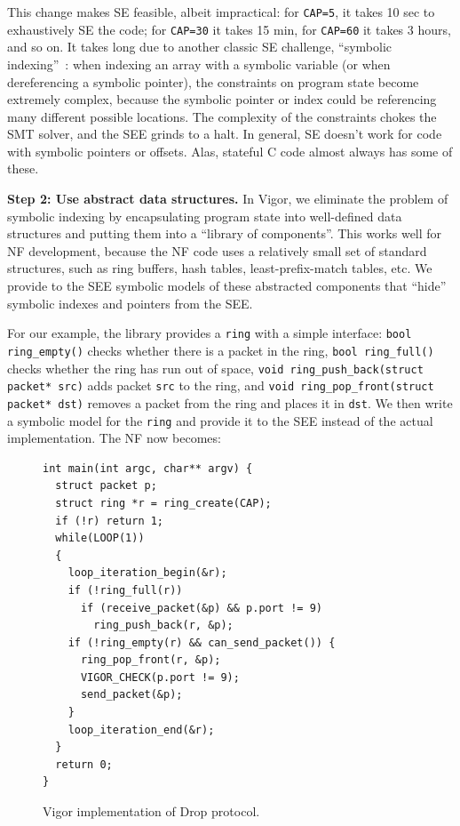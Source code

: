 \documentclass[letterpaper,twocolumn,10pt]{article}
\newcommand{\code}[1]{\lstinline{#1}}
\begin{document}
This change makes SE feasible, albeit impractical: for \code{CAP=5}, it takes 10 sec to exhaustively SE the code; for \code{CAP=30} it takes 15 min, for \code{CAP=60} it takes 3 hours, and so on. It takes long due to another classic SE challenge, ``symbolic indexing''~\cite{sen2005cute,godefroid2008automated,boonstoppel2008rwset}: when indexing an array with a symbolic variable (or when dereferencing a symbolic pointer), the constraints on program state become extremely complex, because the symbolic pointer or index could be referencing many different possible locations. The complexity of the constraints chokes the SMT solver, and the SEE grinds to a halt. In general, SE doesn't work for code with symbolic pointers or offsets. Alas, stateful C code almost always has some of these.

{\bf Step 2: Use abstract data structures.} In Vigor, we eliminate the problem of symbolic indexing by encapsulating program state into well-defined data structures and putting them into a ``library of components''. This works well for NF development, because the NF code uses a relatively small set of standard structures, such as ring buffers, hash tables, least-prefix-match tables, etc. We provide to the SEE symbolic models of these abstracted components that ``hide'' symbolic indexes and pointers from the SEE.

For our example, the library provides a \code{ring} with a simple interface: \code{bool ring_empty()} checks whether there is a packet in the ring, \code{bool ring_full()} checks whether the ring has run out of space, \code{void ring_push_back(struct packet* src)} adds packet \code{src} to the ring, and \code{void ring_pop_front(struct packet* dst)} removes a packet from the ring and places it in \code{dst}. We then write a symbolic model for the \code{ring} and provide it to the SEE instead of the actual implementation. The NF now becomes:

\begin{figure}[h!]
\begin{lstlisting}
int main(int argc, char** argv) {
  struct packet p;
  struct ring *r = ring_create(CAP);
  if (!r) return 1;
  while(LOOP(1))
  {
    loop_iteration_begin(&r);
    if (!ring_full(r))
      if (receive_packet(&p) && p.port != 9)
        ring_push_back(r, &p);
    if (!ring_empty(r) && can_send_packet()) {
      ring_pop_front(r, &p);
      VIGOR_CHECK(p.port != 9);
      send_packet(&p);
    }
    loop_iteration_end(&r);
  }
  return 0;
}
\end{lstlisting}
  \caption{Vigor implementation of Drop protocol.}
  \label{lst:vigor}
\end{figure}
\end{document}
